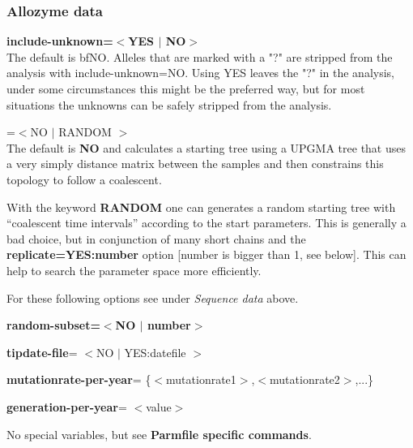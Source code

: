 \subsubsection{Allozyme data}
\begin{description}
\item{\bf{ include-unknown=$<$YES $|$ NO$>$}}\\ The default is {bf{NO}}. Alleles that are marked with a "?" are stripped from the analysis  with include-unknown=NO. Using YES leaves the "?" in the analysis, under some circumstances this might be the preferred way, but for most situations the unknowns can be safely stripped from the analysis.
\item{=$<$NO $|$  RANDOM $>$}\\
The default is \textbf{NO} and \migrate calculates a starting tree using a UPGMA tree that uses a very simply distance matrix between the samples and then constrains this topology to follow a coalescent. 

 With the keyword \textbf{RANDOM} one can generates a random starting tree with ``coalescent time intervals''  according to the start parameters. This is generally a bad choice,  but in conjunction of many short chains and the {\bf replicate=YES:number} 
option [number is bigger than 1, see below]. This can help to search the 
parameter space more efficiently.
\end{description}

For these following options see under \textsl{Sequence data} above.
\begin{description}
\item {\bf random-subset=$<$NO $|$ number$>$}
\item{\bf tipdate-file}= $<$NO $|$ YES:datefile $>$ 
\item{\bf mutationrate-per-year}= \{$<$mutationrate1$>$,$<$mutationrate2$>$,...\} 
\item{\bf generation-per-year}= $<$value$>$ 
\end{description}


No special variables, but see {\bf Parmfile specific commands}.
